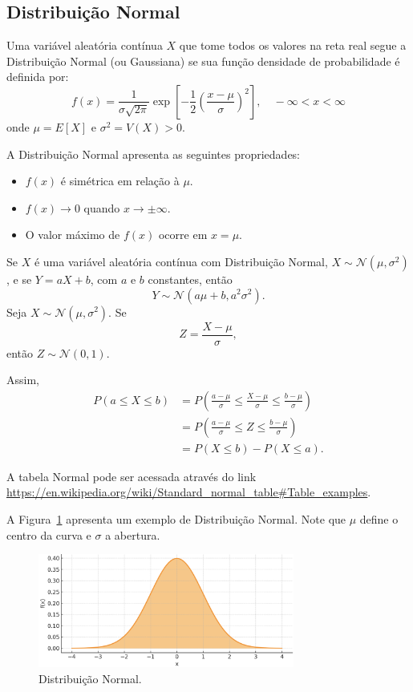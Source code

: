 \documentclass{article}
\begin{document}
\subsection{Distribuição Normal}
Uma variável aleatória contínua $X$ que tome todos os valores na reta real segue a Distribuição Normal (ou Gaussiana) se sua função densidade de probabilidade é definida por:
    $$
    f(x) = \frac{1}{\sigma \sqrt{2\pi}} \exp\left[ -\frac{1}{2} \left( \frac{x - \mu}{\sigma} \right)^2 \right], \quad -\infty < x < \infty
    $$
onde $\mu = E[X]$ e $\sigma^2 = V(X) > 0$.


A Distribuição Normal apresenta as seguintes propriedades:
\begin{itemize}
    \item $f(x)$ é simétrica em relação à $\mu$.
    \item $f(x) \to 0$ quando $x \to \pm\infty$.
    \item O valor máximo de $f(x)$ ocorre em $x = \mu$.
\end{itemize}


Se $X$ é uma variável aleatória contínua com Distribuição Normal, $X \sim \mathcal{N}(\mu, \sigma^2)$, e se $Y = aX + b$, com $a$ e $b$ constantes, então
    $$
    Y \sim \mathcal{N}(a\mu + b, a^2\sigma^2).
    $$
Seja $X \sim \mathcal{N}(\mu, \sigma^2)$. Se
    $$
    Z = \frac{X - \mu}{\sigma},
    $$
então $Z \sim \mathcal{N}(0, 1)$.

Assim,
\begin{align*}
    P(a \leq X \leq b) &= P\left( \frac{a - \mu}{\sigma} \leq \frac{X - \mu}{\sigma} \leq \frac{b - \mu}{\sigma} \right) \\
    &= P\left( \frac{a - \mu}{\sigma} \leq Z \leq \frac{b - \mu}{\sigma} \right) \\
    &= P(X \leq b) - P(X \leq a).
\end{align*}

A tabela Normal pode ser acessada através do link \url{https://en.wikipedia.org/wiki/Standard_normal_table#Table_examples}.

A Figura~\ref{fig:dist_cont_normal} apresenta um exemplo de Distribuição Normal. Note que $\mu$ define o centro da curva e $\sigma$ a abertura.

\begin{figure}[H]
    \centering    \includegraphics[width=0.75\textwidth]{figuras/dist_cont_normal.png}
    \caption{Distribuição Normal.}
    \label{fig:dist_cont_normal}
\end{figure}
\end{document}
